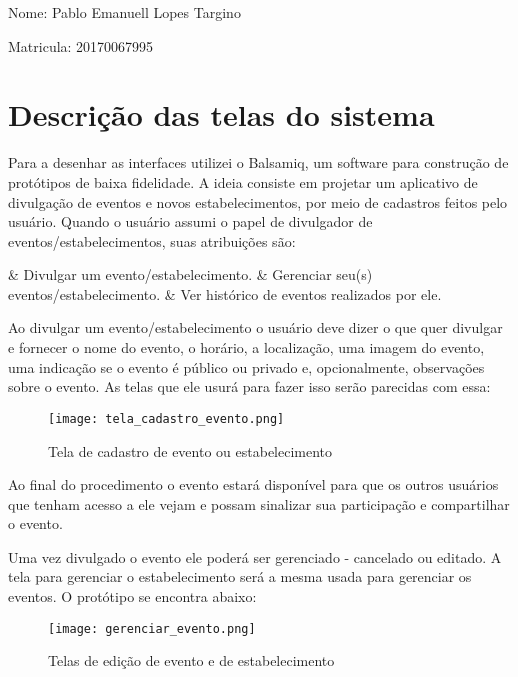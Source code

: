 \documentclass{article}
\begin{document}
			\par Nome: Pablo Emanuell Lopes Targino
			\par Matricula: 20170067995 \bigskip \bigskip
			
				\section{Descrição das telas do sistema} 
			
				\par \indent Para a desenhar as interfaces utilizei o Balsamiq, um software para construção de protótipos de baixa fidelidade.
				A ideia consiste em projetar um aplicativo de divulgação de eventos e novos estabelecimentos, por meio de cadastros feitos pelo usuário.
				Quando o usuário assumi o papel de divulgador de eventos/estabelecimentos, suas atribuições são:\medskip
				\begin{easylist}[itemize]
				& Divulgar um evento/estabelecimento.
				& Gerenciar seu(s) eventos/estabelecimento.
				& Ver histórico de eventos realizados por ele.
				\end{easylist}\medskip
				Ao divulgar um evento/estabelecimento o usuário deve dizer o que quer divulgar e fornecer o nome do evento, o horário, a localização, uma imagem do evento, uma indicação se o evento é público ou privado e, opcionalmente, observações sobre o evento. As telas que ele usurá para fazer isso serão parecidas com essa:
				\bigskip
				
				
				\begin{figure}[H]
				\begin{center}
				\texttt{[image: tela\_cadastro\_evento.png]}
				\end{center}
				\caption{Tela de cadastro de evento ou estabelecimento}
				\end{figure}
				
				
				
				\bigskip
				Ao final do procedimento o evento estará disponível para que os outros usuários que tenham acesso a ele vejam e possam sinalizar sua participação e compartilhar o evento.  
				
				Uma vez divulgado o evento ele poderá ser gerenciado - cancelado ou editado. A tela para gerenciar o estabelecimento será a mesma usada para gerenciar os eventos. O protótipo se encontra abaixo:
				\begin{figure}[H]
				\begin{center}
				\texttt{[image: gerenciar\_evento.png]}
				\end{center}
				\caption{Telas de edição de evento e de  estabelecimento}
				\end{figure}
				
\end{document}
